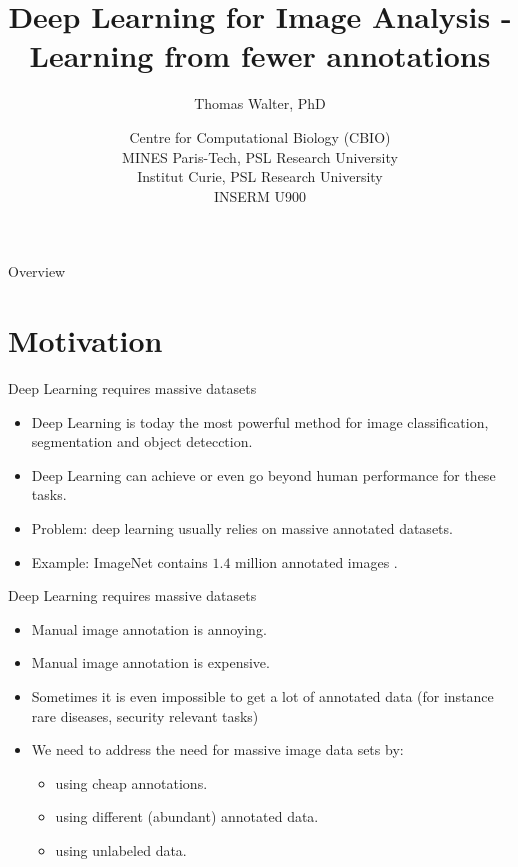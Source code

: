 \documentclass[xcolor=pdftex,dvipsnames,table]{beamer}
\title{Deep Learning for Image Analysis - \\
	   Learning from fewer annotations}
\author{Thomas Walter, PhD}
\date{Centre for Computational Biology (CBIO) \\
	  MINES Paris-Tech, PSL Research University \\
	  Institut Curie, PSL Research University \\
	  INSERM U900}
\begin{document}
\begin{frame}
\titlepage
\end{frame}

\begin{frame}{Overview}
\tableofcontents
\end{frame}

\section{Motivation}

\begin{frame}{Deep Learning requires massive datasets}
\begin{itemize}
	\item Deep Learning is today the most powerful method for image classification, segmentation and object detecction. 
   \item Deep Learning can achieve or even go beyond human performance for these tasks. 
   \item Problem: deep learning usually relies on massive annotated datasets.
   \item Example: ImageNet contains $1.4$ million annotated images \cite{ImageNet:2015}. 
\end{itemize}
\end{frame}

\begin{frame}{Deep Learning requires massive datasets}
\begin{itemize}
\item Manual image annotation is annoying.
\item Manual image annotation is expensive.
\item Sometimes it is even impossible to get a lot of annotated data (for instance rare diseases, security relevant tasks)
\item We need to address the need for massive image data sets by:
\begin{itemize}
   \item using cheap annotations.
   \item using different (abundant) annotated data.
   \item using unlabeled data.
\end{itemize}
\end{itemize}
\end{frame}
\end{document}
